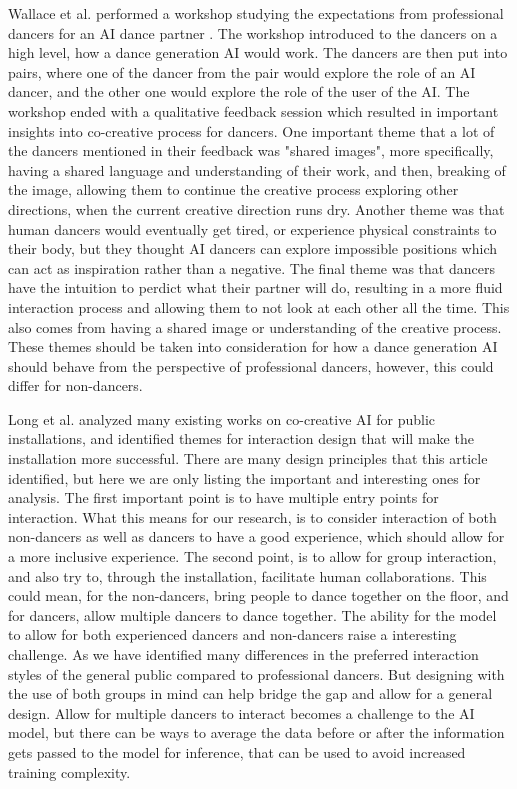 \documentclass[final,5p,times,twocolumn,authoryear]{article}
\begin{document}
Wallace et al. performed a workshop studying the expectations from
professional dancers for an AI dance partner \cite{Wallace2023}. The workshop introduced to
the dancers on a high level, how a dance generation AI would work. The
dancers are then put into pairs, where one of the dancer from the pair
would explore the role of an AI dancer, and the other one would explore
the role of the user of the AI. The workshop ended with a qualitative
feedback session which resulted in important insights into co-creative
process for dancers. One important theme that a lot of the dancers
mentioned in their feedback was "shared images", more specifically,
having a shared language and understanding of their work, and then,
breaking of the image, allowing them to continue the creative process
exploring other directions, when the current creative direction runs
dry. Another theme was that human dancers would eventually get tired, or
experience physical constraints to their body, but they thought AI
dancers can explore impossible positions which can act as inspiration
rather than a negative. The final theme was that dancers have the
intuition to perdict what their partner will do, resulting in a more
fluid interaction process and allowing them to not look at each other
all the time. This also comes from having a shared image or
understanding of the creative process. These themes should be taken into
consideration for how a dance generation AI should behave from the
perspective of professional dancers, however, this could differ for
non-dancers.

Long et al. analyzed many existing works on co-creative AI for public
installations, and identified themes for interaction design that will
make the installation more successful. There are many design principles
that this article identified, but here we are only listing the important
and interesting ones for analysis. The first important point is to
have multiple entry points for interaction. What this means for our
research, is to consider interaction of both non-dancers as well as
dancers to have a good experience, which should allow for a more
inclusive experience. The second point, is to allow for group
interaction, and also try to, through the installation, facilitate human
collaborations. This could mean, for the non-dancers, bring people to
dance together on the floor, and for dancers, allow multiple dancers to
dance together. The ability for the model to allow for both
experienced dancers and non-dancers raise a interesting challenge. As we
have identified many differences in the preferred interaction styles of
the general public compared to professional dancers. But designing with
the use of both groups in mind can help bridge the gap and allow for a
general design. Allow for multiple dancers to interact becomes a
challenge to the AI model, but there can be ways to average the data
before or after the information gets passed to the model for inference,
that can be used to avoid increased training complexity.
\end{document}

